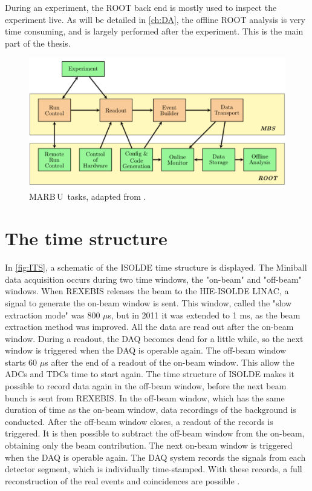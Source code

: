 \documentclass[twoside,english]{uiofysmaster/uiofysmaster}
\newcommand{\MBOU}{MAR\belowbaseline[-2pt]{a}B\stackinset{l}{3pt}{b}{-3pt}{O}{O}\,U}
\let\orgautoref\autoref
\renewcommand{\autoref}
        {%
		 \def\sectionautorefname{Section}%
		 \def\subsectionautorefname{Section}%
		 \def\subsubsectionautorefname{Section}%
		 \def\chapterautorefname{Chapter}%
          \orgautoref}
\begin{document}
During an experiment, the ROOT back end is mostly used to inspect the experiment live. 
As will be detailed in \autoref{ch:DA}, the offline ROOT analysis is very time consuming, and is largely performed after the experiment. 
This is the main part of the thesis.

\begin{figure}[htb]
	\centering
	\includegraphics[width=\linewidth]{Images/MARaBOOU.png}
	\caption{\protect\MBOU\ tasks, adapted from \cite{Maraboou}.}
	\label{fig:MARaBOOU}
\end{figure}


\section{The time structure}\label{sec:time_structure}
In \autoref{fig:ITS}, a schematic of the ISOLDE time structure is displayed. 
The Miniball data acquisition occurs during two time windows, the "on-beam" and "off-beam" windows. 
When REXEBIS releases the beam to the HIE-ISOLDE LINAC, a signal to generate the on-beam window is sent. 
This window, called the "slow extraction mode" was 800 $\mu$s, but in 2011 it was extended to 1 ms, as the beam extraction method was improved. 
All the data are read out after the on-beam window. 
During a readout, the DAQ becomes dead for a little while, so the next window is triggered when the DAQ is operable again.
The off-beam window starts 60 $\mu$s after the end of a readout of the on-beam window.
This allow the ADCs and TDCs time to start again.
The time structure of ISOLDE makes it possible to record data again in the off-beam window, before the next beam bunch is sent from REXEBIS.
In the off-beam window, which has the same duration of time as the on-beam window, data recordings of the background is conducted.
After the off-beam window closes, a readout of the records is triggered.
It is then possible to subtract the off-beam window from the on-beam, obtaining only the beam contribution. 
The next on-beam window is triggered when the DAQ is operable again.
The DAQ system records the signals from each detector segment, which is individually time-stamped. 
With these records, a full reconstruction of the real events and coincidences are possible \cite{NWarr-el}. 
\end{document}

